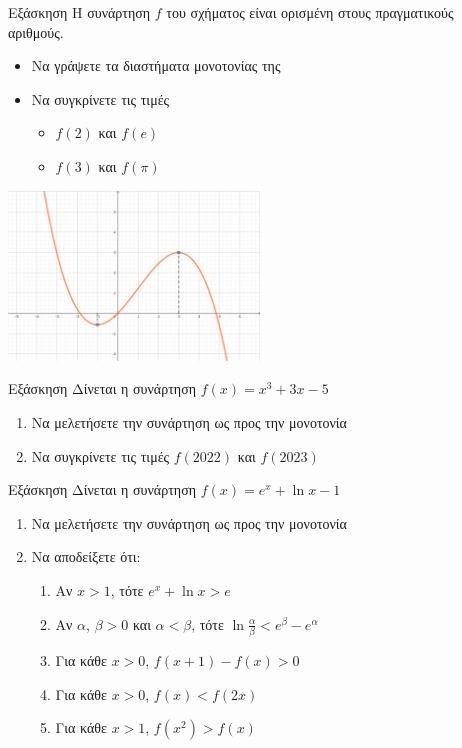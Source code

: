 \documentclass[greek]{beamer}
\begin{document}
\begin{frame}{Εξάσκηση}
      Η συνάρτηση $f$ του σχήματος είναι ορισμένη στους πραγματικούς αριθμούς.
      \begin{itemize}
            \item Να γράψετε τα διαστήματα μονοτονίας της
            \item Να συγκρίνετε τις τιμές
                  \begin{itemize}
                        \item $f(2)$ και $f(e)$
                        \item $f(3)$ και $f(\pi)$
                  \end{itemize}
      \end{itemize}
      \centering
      \includegraphics[width=0.5\textwidth]{"images/1.3 Μονοτονία.png"}
\end{frame}

\begin{frame}{Εξάσκηση}
      Δίνεται η συνάρτηση $f(x)=x^3+3x-5$
      \begin{enumerate}
            \item Να μελετήσετε την συνάρτηση ως προς την μονοτονία \pause
            \item Να συγκρίνετε τις τιμές $f(2022)$ και $f(2023)$
      \end{enumerate}
\end{frame}

\begin{frame}{Εξάσκηση}
      Δίνεται η συνάρτηση $f(x)=e^x+\ln x-1$
      \begin{enumerate}
            \item Να μελετήσετε την συνάρτηση ως προς την μονοτονία \pause
            \item Να αποδείξετε ότι:
                  \begin{enumerate}
                        \item Αν $x>1$, τότε $e^x+\ln x>e$ \pause
                        \item Αν $α$, $β>0$ και $α<β$, τότε $\ln \frac{α}{β}<e^β-e^α$ \pause
                        \item Για κάθε $x>0$, $f(x+1)-f(x)>0$ \pause
                        \item Για κάθε $x>0$, $f(x)<f(2x)$ \pause
                        \item Για κάθε $x>1$, $f(x^2)>f(x)$
                  \end{enumerate}
      \end{enumerate}
\end{frame}
\end{document}
